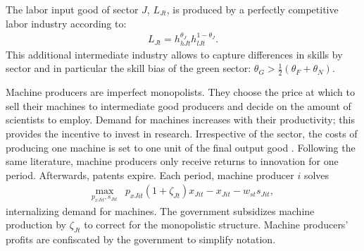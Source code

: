 The labor input good of sector $J$, $L_{Jt}$, is produced by a perfectly competitive labor industry according to: 
\begin{align*}
L_{Jt}=h_{hJt}^{\theta_J}h_{lJt}^{1-\theta_J}.
\end{align*}
This additional intermediate industry allows to capture differences in skills by sector and in particular the skill bias of the green sector: $\theta_G>\frac{1}{2}(\theta_F+\theta_N)$. 

Machine producers are imperfect monopolists. They choose the price at which to sell their machines to intermediate good producers and decide on the amount of scientists to employ. Demand for machines increases with their productivity; this provides the incentive to invest in research. Irrespective of the sector, the costs of producing one machine is set to one unit of the final output good \citep[similar to][]{Fried2018ClimateAnalysis, Acemoglu2012TheChange}. 
Following the same literature, machine producers only receive returns to innovation for one period. Afterwards, patents expire. 
Each period, machine producer $i$ solves
\begin{align*}
\underset{p_{xJit}, s_{Jit}}{\max}&p_{xJit}(1+\zeta_{Jt})x_{Jit}-x_{Jit}-w_{st}s_{Jit},
\end{align*}
internalizing demand for machines. 
The government subsidizes machine production by $\zeta_{Jt}$ to correct for the monopolistic structure. Machine producers' profits are confiscated by the government to simplify notation.

